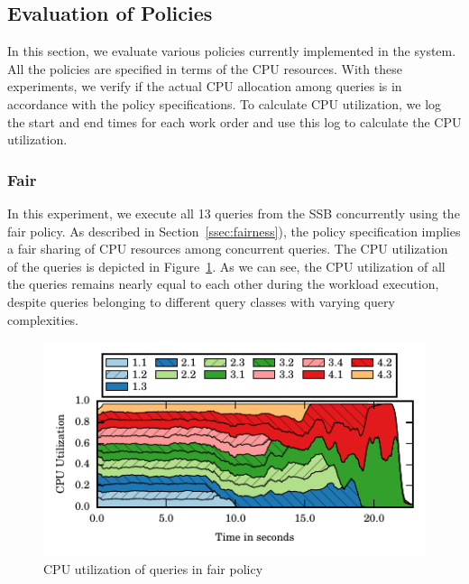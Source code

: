 \subsection{Evaluation of Policies}\label{ssec:policy-eval}
In this section, we evaluate various policies currently implemented in the system.
All the policies are specified in terms of the CPU resources. 
With these experiments, we verify if the actual CPU allocation among queries is in accordance with the policy specifications.
To calculate CPU utilization, we log the start and end times for each work order and use this log to calculate the CPU utilization.

\subsubsection{Fair}
In this experiment, we execute all 13 queries from the SSB concurrently using the fair policy. 
As described in Section~\ref{ssec:fairness}), the policy specification implies a fair sharing of CPU resources among concurrent queries.
The CPU utilization of the queries is depicted in Figure~\ref{fig:fair-cpu-util}.
As we can see, %
the CPU utilization of all the queries remains nearly equal to each other during the workload execution, despite queries belonging to different query classes with varying query complexities.

\begin{figure}[]
	\centering
	\includegraphics[width=\columnwidth]{figures/ssb-all-uniform-fair-cpu-util.pdf}
	\vspace{-2.5em}
	\caption{CPU utilization of queries in fair policy}
	\label{fig:fair-cpu-util}
\end{figure}

